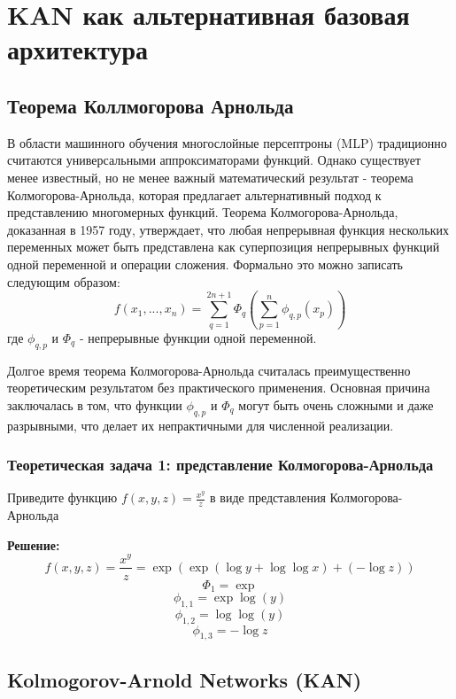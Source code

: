 \section{KAN как альтернативная базовая архитектура}
\subsection{Теорема Коллмогорова Арнольда}

В области машинного обучения многослойные персептроны (MLP) традиционно считаются универсальными аппроксиматорами функций. Однако существует менее известный, но не менее важный математический результат - теорема Колмогорова-Арнольда, которая предлагает альтернативный подход к представлению многомерных функций.
Теорема Колмогорова-Арнольда, доказанная в 1957 году, утверждает, что любая непрерывная функция нескольких переменных может быть представлена как суперпозиция непрерывных функций одной переменной и операции сложения. Формально это можно записать следующим образом:
\[
	f(x_1, ..., x_n) = \sum_{q=1}^{2n+1} \Phi_q \left(\sum_{p=1}^n \phi_{q,p}(x_p)\right)
\]
где $\phi_{q,p}$ и $\Phi_q $ - непрерывные функции одной переменной.

Долгое время теорема Колмогорова-Арнольда считалась преимущественно теоретическим результатом без практического применения. Основная причина заключалась в том, что функции $\phi_{q,p}$ и $\Phi_q$ могут быть очень сложными и даже разрывными, что делает их непрактичными для численной реализации.

\subsubsection{Теоретическая задача 1: представление Колмогорова-Арнольда}
Приведите функцию $ f(x,y,z) = \frac{x^y}{z} $ в виде представления Колмогорова-Арнольда

\textbf{Решение:}
\[
	f(x,y,z) = \frac{x^y}{z} = \exp(\exp(\log y + \log \log x) + (-\log z))
\]
\[
	\Phi_1 = \exp
\]
\[
	\phi_{1, 1} = \exp\log(y)
\]
\[
	\phi_{1, 2} = \log\log(y)
\]
\[
	\phi_{1, 3} = -\log z
\]

\subsection{Kolmogorov-Arnold Networks (KAN)}

